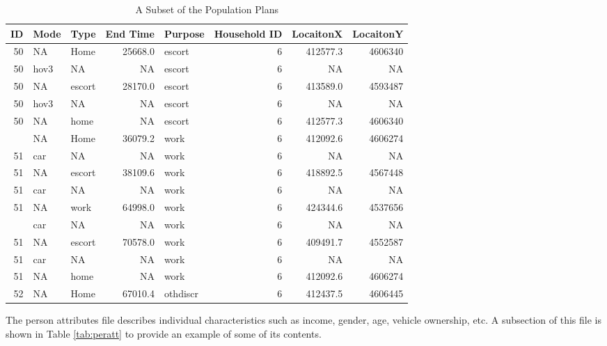 \documentclass[12pt, oneside, openright]{byuthesis}
\begin{document}
\begin{table}

\caption{\label{tab:plans}A Subset of the Population Plans}
\centering
\begin{tabular}[t]{rllrlrrr}
\toprule
ID & Mode & Type & End Time & Purpose & Household ID & LocaitonX & LocaitonY\\
\midrule
50 & NA & Home & 25668.0 & escort & 6 & 412577.3 & 4606340\\
50 & hov3 & NA & NA & escort & 6 & NA & NA\\
50 & NA & escort & 28170.0 & escort & 6 & 413589.0 & 4593487\\
50 & hov3 & NA & NA & escort & 6 & NA & NA\\
50 & NA & home & NA & escort & 6 & 412577.3 & 4606340\\
\addlinespace
51 & NA & Home & 36079.2 & work & 6 & 412092.6 & 4606274\\
51 & car & NA & NA & work & 6 & NA & NA\\
51 & NA & escort & 38109.6 & work & 6 & 418892.5 & 4567448\\
51 & car & NA & NA & work & 6 & NA & NA\\
51 & NA & work & 64998.0 & work & 6 & 424344.6 & 4537656\\
\addlinespace
51 & car & NA & NA & work & 6 & NA & NA\\
51 & NA & escort & 70578.0 & work & 6 & 409491.7 & 4552587\\
51 & car & NA & NA & work & 6 & NA & NA\\
51 & NA & home & NA & work & 6 & 412092.6 & 4606274\\
52 & NA & Home & 67010.4 & othdiscr & 6 & 412437.5 & 4606445\\
\bottomrule
\end{tabular}
\end{table}

The person attributes file describes individual characteristics such as income, gender, age, vehicle ownership, etc. A subsection of this file is shown in Table \ref{tab:peratt} to provide an example of some of its contents.
\end{document}
